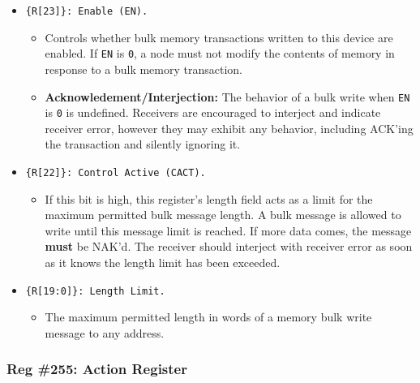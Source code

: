 \begin{itemize}
  \item {\tt \{R[23]\}: Enable (EN).}
    \begin{itemize}
      \item Controls whether bulk memory transactions written to this device
        are enabled. If {\tt EN} is {\tt 0}, a node must not modify the
        contents of memory in response to a bulk memory transaction.
      \item {\bf Acknowledement/Interjection:} The behavior of a bulk write
        when {\tt EN} is {\tt 0} is undefined. Receivers are encouraged to
        interject and indicate receiver error, however they may exhibit any
        behavior, including ACK'ing the transaction and silently ignoring it.
    \end{itemize}
  \item {\tt \{R[22]\}: Control Active (CACT).}
    \begin{itemize}
      \item If this bit is high, this register's length field acts as a limit
        for the maximum permitted bulk message length. A bulk message is
        allowed to write until this message limit is reached. If more data
        comes, the message {\bf must} be NAK'd. The receiver should interject
        with receiver error as soon as it knows the length limit has been
        exceeded.
    \end{itemize}
  \item {\tt \{R[19:0]\}: Length Limit.}
    \begin{itemize}
      \item The maximum permitted length in words of a memory bulk write
        message to any address.
    \end{itemize}
\end{itemize}


\subsubsection{Reg \#255: Action Register}
\label{cmd:conf-reg-reset}

